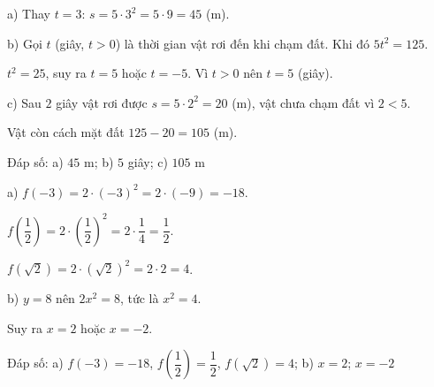 \begin{problem}[9DS-HSB2-013]
a) Thay $t = 3$: $s = 5 \cdot 3^2 = 5 \cdot 9 = 45$ (m).

b) Gọi $t$ (giây, $t > 0$) là thời gian vật rơi đến khi chạm đất. Khi đó $5t^2 = 125$.

$t^2 = 25$, suy ra $t = 5$ hoặc $t = -5$. Vì $t > 0$ nên $t = 5$ (giây).

c) Sau $2$ giây vật rơi được $s = 5 \cdot 2^2 = 20$ (m), vật chưa chạm đất vì $2 < 5$.

Vật còn cách mặt đất $125 - 20 = 105$ (m).

Đáp số: a) $45$ m; b) $5$ giây; c) $105$ m
\end{problem}

\begin{problem}[9DS-HSB2-001]
a) $f(-3) = 2 \cdot (-3)^2 = 2 \cdot (-9) = -18$.

$f\left(\dfrac{1}{2}\right) = 2 \cdot \left(\dfrac{1}{2}\right)^2 = 2 \cdot \dfrac{1}{4} = \dfrac{1}{2}$.

$f\left(\sqrt{2}\right) = 2 \cdot \left(\sqrt{2}\right)^2 = 2 \cdot 2 = 4$.

b) $y = 8$ nên $2x^2 = 8$, tức là $x^2 = 4$.

Suy ra $x = 2$ hoặc $x = -2$.

Đáp số: a) $f(-3) = -18$, $f\left(\dfrac{1}{2}\right) = \dfrac{1}{2}$, $f\left(\sqrt{2}\right) = 4$; b) $x = 2$; $x = -2$
\end{problem}
